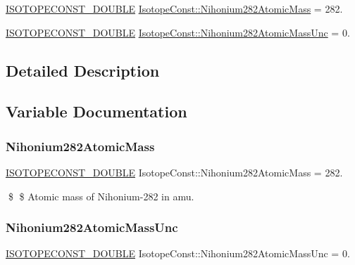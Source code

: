 \begin{DoxyCompactItemize}
\item 
\mbox{\hyperlink{group___isotope_const-_macros_ga8f45a7272ce02c0b4c65c44636ed719a}{I\+S\+O\+T\+O\+P\+E\+C\+O\+N\+S\+T\+\_\+\+D\+O\+U\+B\+LE}} \mbox{\hyperlink{group___isotope_const-_nihonium-_nh282_gae1e983f0d0f1980e83d091f1bd581c7c}{Isotope\+Const\+::\+Nihonium282\+Atomic\+Mass}} = 282.
\item 
\mbox{\hyperlink{group___isotope_const-_macros_ga8f45a7272ce02c0b4c65c44636ed719a}{I\+S\+O\+T\+O\+P\+E\+C\+O\+N\+S\+T\+\_\+\+D\+O\+U\+B\+LE}} \mbox{\hyperlink{group___isotope_const-_nihonium-_nh282_ga76a55e0b4844a728d1e1e0fe13db1645}{Isotope\+Const\+::\+Nihonium282\+Atomic\+Mass\+Unc}} = 0.
\end{DoxyCompactItemize}


\subsection{Detailed Description}


\subsection{Variable Documentation}
\mbox{\label{group___isotope_const-_nihonium-_nh282_gae1e983f0d0f1980e83d091f1bd581c7c}} 
\subsubsection{\texorpdfstring{Nihonium282\+Atomic\+Mass}{Nihonium282AtomicMass}}
{\footnotesize\ttfamily \mbox{\hyperlink{group___isotope_const-_macros_ga8f45a7272ce02c0b4c65c44636ed719a}{I\+S\+O\+T\+O\+P\+E\+C\+O\+N\+S\+T\+\_\+\+D\+O\+U\+B\+LE}} Isotope\+Const\+::\+Nihonium282\+Atomic\+Mass = 282.}

\$ \$ Atomic mass of Nihonium-\/282 in amu. \mbox{\label{group___isotope_const-_nihonium-_nh282_ga76a55e0b4844a728d1e1e0fe13db1645}} 
\subsubsection{\texorpdfstring{Nihonium282\+Atomic\+Mass\+Unc}{Nihonium282AtomicMassUnc}}
{\footnotesize\ttfamily \mbox{\hyperlink{group___isotope_const-_macros_ga8f45a7272ce02c0b4c65c44636ed719a}{I\+S\+O\+T\+O\+P\+E\+C\+O\+N\+S\+T\+\_\+\+D\+O\+U\+B\+LE}} Isotope\+Const\+::\+Nihonium282\+Atomic\+Mass\+Unc = 0.}

